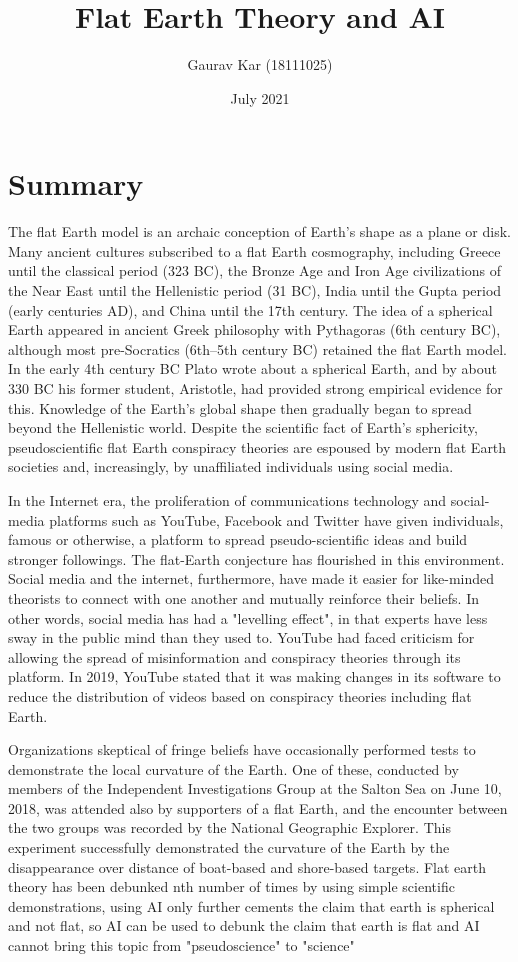 \documentclass{article}
\title{Flat Earth Theory and AI}
\author{Gaurav Kar (18111025)}
\date{July 2021}
\begin{document}
\maketitle

\section{Summary}
The flat Earth model is an archaic conception of Earth's shape as a plane or disk. Many ancient cultures subscribed to a flat Earth cosmography, including Greece until the classical period (323 BC), the Bronze Age and Iron Age civilizations of the Near East until the Hellenistic period (31 BC), India until the Gupta period (early centuries AD), and China until the 17th century. The idea of a spherical Earth appeared in ancient Greek philosophy with Pythagoras (6th century BC), although most pre-Socratics (6th–5th century BC) retained the flat Earth model. In the early 4th century BC Plato wrote about a spherical Earth, and by about 330 BC his former student, Aristotle, had provided strong empirical evidence for this. Knowledge of the Earth's global shape then gradually began to spread beyond the Hellenistic world. Despite the scientific fact of Earth's sphericity, pseudoscientific flat Earth conspiracy theories are espoused by modern flat Earth societies and, increasingly, by unaffiliated individuals using social media.

In the Internet era, the proliferation of communications technology and social-media platforms such as YouTube, Facebook and Twitter have given individuals, famous or otherwise, a platform to spread pseudo-scientific ideas and build stronger followings. The flat-Earth conjecture has flourished in this environment. Social media and the internet, furthermore, have made it easier for like-minded theorists to connect with one another and mutually reinforce their beliefs. In other words, social media has had a "levelling effect", in that experts have less sway in the public mind than they used to. YouTube had faced criticism for allowing the spread of misinformation and conspiracy theories through its platform. In 2019, YouTube stated that it was making changes in its software to reduce the distribution of videos based on conspiracy theories including flat Earth.

Organizations skeptical of fringe beliefs have occasionally performed tests to demonstrate the local curvature of the Earth. One of these, conducted by members of the Independent Investigations Group at the Salton Sea on June 10, 2018, was attended also by supporters of a flat Earth, and the encounter between the two groups was recorded by the National Geographic Explorer. This experiment successfully demonstrated the curvature of the Earth by the disappearance over distance of boat-based and shore-based targets.
Flat earth theory has been debunked nth number of times by using simple scientific demonstrations, using AI only further cements the claim that earth is spherical and not flat, so AI can be used to debunk the claim that earth is flat and AI cannot bring this topic from "pseudoscience" to "science" 
\end{document}
